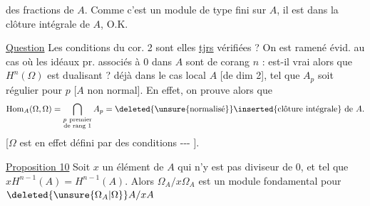 des fractions de $A$. Comme c'est un module de
type fini sur $A$, il est dans la clôture
intégrale de $A$, O.K.

\uline{Question} Les conditions du cor. 2 sont elles
\uline{tjrs} vérifiées ? On est ramené évid. au cas
où les idéaux pr. associés à $0$ dans $A$
sont de  corang $n$ : est-il vrai alors
que $H^n(\Omega)$ est dualisant ?  déjà
dans le cas  
local  $A$ [de dim 2], tel que $A_p$ soit
régulier pour $p$  [$A$ non normal]. En
effet,  on prouve alors que
\[
\operatorname{Hom}_A(\Omega,\Omega)=\bigcap_{\substack{p\ \text{premier}\\\text{de rang }1}}A_p
=\deleted{\text{\unsure{normalisé}}}\inserted{\text{clôture intégrale}}\text{ de }A .
\]
[$\Omega$ est en effet défini par des conditions 
\mbox{-{}-{}-} ].

\uline{Proposition 10} Soit $x$ un élément de $A$ qui
n'y est pas diviseur de $0$, et tel que
$xH^{n-1}(A)=H^{n-1}(A)$. Alors $\Omega_A/x\Omega_A$ est
un module fondamental pour $\deleted{\unsure{\Omega_A|\Omega}}A/xA$


